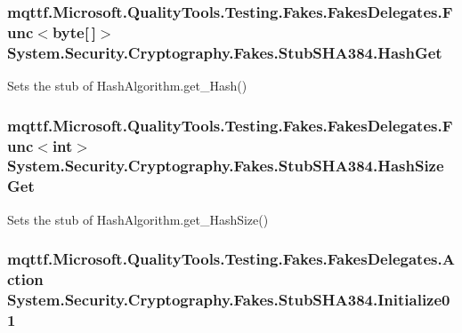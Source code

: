 \hypertarget{class_system_1_1_security_1_1_cryptography_1_1_fakes_1_1_stub_s_h_a384_a1fa78d025998124855ecc57bb1b2e4a8}{
\subsubsection[{Hash\-Get}]{\setlength{\rightskip}{0pt plus 5cm}mqttf.\-Microsoft.\-Quality\-Tools.\-Testing.\-Fakes.\-Fakes\-Delegates.\-Func$<$byte\mbox{[}$\,$\mbox{]}$>$ System.\-Security.\-Cryptography.\-Fakes.\-Stub\-S\-H\-A384.\-Hash\-Get}}\label{class_system_1_1_security_1_1_cryptography_1_1_fakes_1_1_stub_s_h_a384_a1fa78d025998124855ecc57bb1b2e4a8}


Sets the stub of Hash\-Algorithm.\-get\-\_\-\-Hash()

\hypertarget{class_system_1_1_security_1_1_cryptography_1_1_fakes_1_1_stub_s_h_a384_a907f2ef3d8d91b53d71037ecd356bffd}{
\subsubsection[{Hash\-Size\-Get}]{\setlength{\rightskip}{0pt plus 5cm}mqttf.\-Microsoft.\-Quality\-Tools.\-Testing.\-Fakes.\-Fakes\-Delegates.\-Func$<$int$>$ System.\-Security.\-Cryptography.\-Fakes.\-Stub\-S\-H\-A384.\-Hash\-Size\-Get}}\label{class_system_1_1_security_1_1_cryptography_1_1_fakes_1_1_stub_s_h_a384_a907f2ef3d8d91b53d71037ecd356bffd}


Sets the stub of Hash\-Algorithm.\-get\-\_\-\-Hash\-Size()

\hypertarget{class_system_1_1_security_1_1_cryptography_1_1_fakes_1_1_stub_s_h_a384_a6c7d2d5e8f599bfa3ab9deeec08dd306}{
\subsubsection[{Initialize01}]{\setlength{\rightskip}{0pt plus 5cm}mqttf.\-Microsoft.\-Quality\-Tools.\-Testing.\-Fakes.\-Fakes\-Delegates.\-Action System.\-Security.\-Cryptography.\-Fakes.\-Stub\-S\-H\-A384.\-Initialize01}}\label{class_system_1_1_security_1_1_cryptography_1_1_fakes_1_1_stub_s_h_a384_a6c7d2d5e8f599bfa3ab9deeec08dd306}


